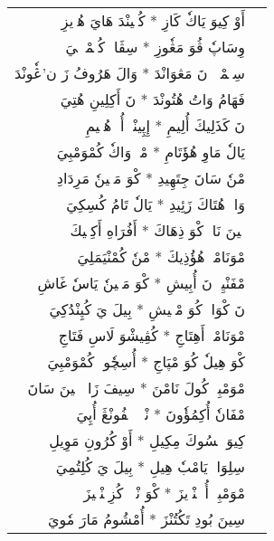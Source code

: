 \documentclass[a4paper, 12pt]{report}
\begin{document}
\begin{longtable}{rl}
\textarabic{أَوْ كِيوَ يَاكٗ كَازِ  *  كُتٖينْدَ هَايَ هُوٖيزِ} & \\ 
\textarabic{وِسَاپٗ ڤُوَ مَڠٗوزِ  *  سِڤَاءٖ كُتٖمْبٖلٖيَ} & \\ 
[8mm] 

\textarabic{سِتٖمْبٖئٖ نَ مَڠوَانْدَ  *  وَالَ هَرُوفُ زَ ن’ڠٗونْدَ} & \\ 
\textarabic{فَهَامُ وَاتُ هُتُونْدَ  *  نَ أَكِلِينِ هُتِيَ} & \\ 
[8mm] 

\textarabic{نَ كَذَلِيكَ أُلِيمِ  *  إِپِينْدٖ أُوٖ هُسٖيمِ} & \\ 
\textarabic{يَالٗ مَاوِ هُؤَتَامِ  *  مْكٖ وَاكٗ كُمْوَمْبِيَ} & \\ 
[8mm] 

\textarabic{مْنٗ سَانَ جِتَهِيدِ  *  كْوَ مَنٖينٗ مَرِدَادِ} & \\ 
\textarabic{وَاكٖ هُتَاكَ زَئِيدِ  *  يَالٗ تَامُ كُسِكِيَ} & \\ 
[8mm] 

\textarabic{نٖينَ نَايٖ كْوَ ذِهَاكَ  *  أَفُرَاهِ أَكِچٖيكَ} & \\ 
\textarabic{مْوَنَامْكٖ هُؤُذِيكَ  *  مْنٗ كُمْنْيَمَلِيَ} & \\ 
[8mm] 

\textarabic{مْفَنْيِئٖ نَ أُبِيشِ  *  كْوَ مَنٖينٗ يَاسٗ غَاشِ} & \\ 
\textarabic{نَ كْوَاكٖ كُوَ مْتٖيشِ  *  بِيلَ يَ كُپِنْدُكِيَ} & \\ 
[8mm] 

\textarabic{مْوَنَامْكٖ أَهِتَاجِ  *  كُڤِيشْوَ لَاسِ فَتَاجِ} & \\ 
\textarabic{كْوَ هِيلٗ كُوَ مْپَاجِ  *  أُسِچٗوكٖ كُمْوَمْبِيَ} & \\ 
[8mm] 

\textarabic{مْوَمْبِيٖ كُولَ نَامْنَ  *  سِيفَ زَاكٖ تٖينَ سَانَ} & \\ 
\textarabic{مْفَانٗ أُكِمُؤٗونَ  *  نْيٖئٖ مٖفُونْڠَ أُپِيَ} & \\ 
[8mm] 

\textarabic{كِيوَ مٖسُوكَ مِكِيلِ  *  أَوْ كُرُونِ مَوِيلِ} & \\ 
\textarabic{سِلِوَاتٖ يَامْبٗ هِيلِ  *  بِيلَ يَ كُلِتُمِيَ} & \\ 
[8mm] 

\textarabic{مْوَمْبِيٖ أُمٖپٖنْدٖيزَ  *  كْوَ نْيٖئٖ كُزِتٖنْڠٖيزَ} & \\ 
\textarabic{سِينَ بُودِ تَكُتُنْزَ  *  أُمْشُومُ مَارَ مٗويَ} & \\ 
[8mm] 


\end{longtable}
\end{document}
